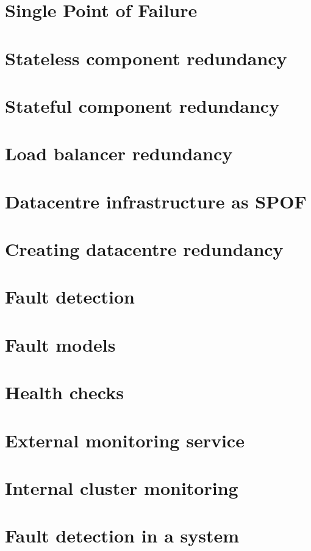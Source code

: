 \documentclass[11pt]{article}
\begin{document}
\section{Single Point of Failure}

\section{Stateless component redundancy}

\section{Stateful component redundancy}

\section{Load balancer redundancy}

\section{Datacentre infrastructure as SPOF}

\section{Creating datacentre redundancy}

\section{Fault detection}

\section{Fault models}

\section{Health checks}

\section{External monitoring service}

\section{Internal cluster monitoring}

\section{Fault detection in a system}
\end{document}

